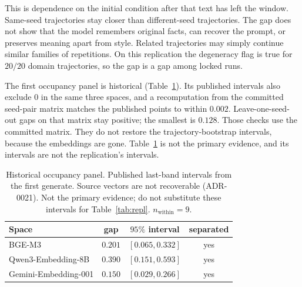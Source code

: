 \documentclass[10pt]{article}
\begin{document}
This is dependence on the initial condition after that text has left
the window.
Same-seed trajectories stay closer than different-seed trajectories.
The gap does not show that the model remembers original facts, can
recover the prompt, or preserves meaning apart from style.
Related trajectories may simply continue similar families of
repetitions.
On this replication the degeneracy flag is true for $20/20$ domain
trajectories, so the gap is a gap among locked runs. %

The first occupancy panel is historical
(Table~\ref{tab:archival}).
Its published intervals also exclude $0$ in the same three spaces, and
a recomputation from the committed seed-pair matrix matches the
published points to within $0.002$. %
Leave-one-seed-out gaps on that matrix stay positive; the smallest is
$0.128$. %
Those checks use the committed matrix.
They do not restore the trajectory-bootstrap intervals, because the
embeddings are gone.
Table~\ref{tab:archival} is not the primary evidence, and its intervals
are not the replication's intervals.

\begin{table}[t]
  \centering
  \caption{Historical occupancy panel.
    Published last-band intervals from the first generate.
    Source vectors are not recoverable (ADR-0021). %
    Not the primary evidence; do not substitute these intervals for
    Table~\ref{tab:repl}.
    $n_{\mathrm{within}}{=}9$.} %
  \label{tab:archival}
  \begin{tabular}{@{}lccc@{}}
    \toprule
    Space & gap & $95\%$ interval & separated \\
    \midrule
    BGE-M3 & $0.201$ & $[0.065, 0.332]$ & yes \\ %
    Qwen3-Embedding-8B & $0.390$ & $[0.151, 0.593]$ & yes \\ %
    Gemini-Embedding-001 & $0.150$ & $[0.029, 0.266]$ & yes \\ %
    \bottomrule
  \end{tabular}
\end{table}
\end{document}
